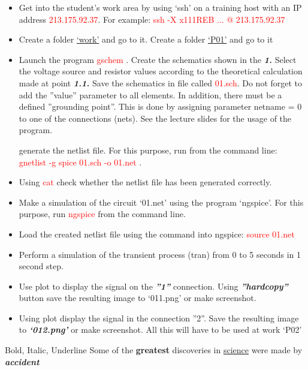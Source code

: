 \documentclass{report}
\begin{document}
\begin{itemize}
  \item Get into the student’s work area by using ‘ssh’ on a training host with an IP address
\textcolor{red}{213.175.92.37}. For example: \textcolor{red}{ssh -X x111REB ... @ 213.175.92.37}
  \item Create a folder \underline{‘work’} and go to it. Create a folder \underline{‘P01’} and go to it
  \item Launch the program \textcolor{red}{gschem} . Create the schematics shown in the \textbf{\textit{1. }}Select the voltage
source and resistor values according to the theoretical calculation made at point \textbf{\textit{1.1.}}
Save the schematics in file called \textcolor{red}{01.sch}. Do not forget to add the ”value” parameter
to all elements. In addition, there must be a defined ”grounding point”. This is done by
assigning parameter netname = 0 to one of the connections (nets). See the lecture slides
for the usage of the program.

generate the netlist file. For this purpose, run from the command line: \textcolor{red}{gnetlist -g spice 01.sch -o 01.net }.
\item Using \textcolor{red}{cat} check whether the netlist file has been generated correctly.
\item Make a simulation of the circuit ‘01.net’ using the program ‘ngspice’. For this purpose,
run \textcolor{red}{ngspice} from the command line.
\item Load the created netlist file using the command into ngspice: \textcolor{red}{source 01.net}
\item Perform a simulation of the transient process (tran) from 0 to 5 seconds in 1 second step.
\item Use plot to display the signal on the \textbf{\textit{”1”}} connection. Using \textbf{\textit{”hardcopy”}} button save
the resulting image to ‘011.png’ or make screenshot.
\item Using plot display the signal in the connection ”2”. Save the resulting image to \textbf{\textit{‘012.png’}}
or make screenshot. All this will have to be used at work ‘P02’
\end{itemize}

Bold, Italic, Underline
Some of the \textbf{greatest}
discoveries in \underline{science} 
were made by \textbf{\textit{accident}}
\end{document}
